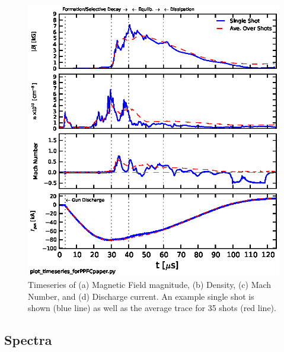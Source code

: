 \documentclass[12pt]{iopart}
\begin{document}
\begin{figure}[!htbp]
\centerline{
\includegraphics[width=16cm]{timeseries36.eps}}
\caption{\label{fig:timeseries36} Timeseries of (a) Magnetic Field magnitude, (b) Density, (c) Mach Number, and (d) Discharge current. An example single shot is shown (blue line) as well as the average trace for 35 shots (red line).}
\end{figure}

\subsection{Spectra}
\end{document}
